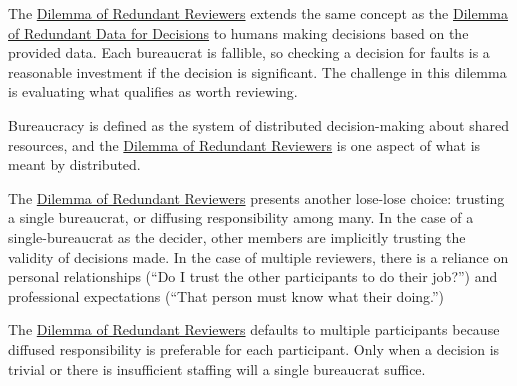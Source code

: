 The \hyperref[table:dilemma-personal-redundant-reviewers]{Dilemma of Redundant Reviewers} extends the same concept as the \hyperref[table:dilemma-personal-single-bit-decision]{Dilemma of Redundant Data for Decisions} to humans making decisions based on the provided data. Each bureaucrat is fallible, so checking a decision for faults is a reasonable investment if the decision is significant. The challenge in this dilemma is evaluating what qualifies as worth reviewing.

Bureaucracy is defined as the system of distributed decision-making about shared resources, and the \hyperref[table:dilemma-personal-redundant-reviewers]{Dilemma of Redundant Reviewers} is one aspect of what is meant by distributed.

The \hyperref[table:dilemma-personal-redundant-reviewers]{Dilemma of Redundant Reviewers} presents another lose-lose choice: trusting a single bureaucrat, or diffusing responsibility among many. In the case of a single-bureaucrat as the decider, other members are implicitly trusting the validity of decisions made. In the case of multiple reviewers, there is a reliance on personal relationships (``Do I trust the other participants to do their job?'') and professional expectations (``That person must know what their doing.'')

The \hyperref[table:dilemma-personal-redundant-reviewers]{Dilemma of Redundant Reviewers} defaults to multiple participants because diffused responsibility is preferable for each participant. Only when a decision is trivial or there is insufficient staffing will a single bureaucrat suffice.


